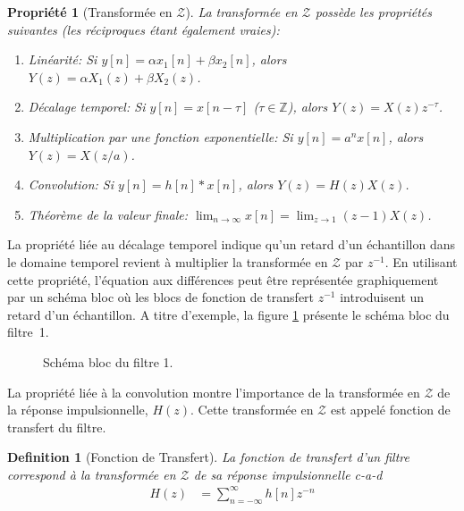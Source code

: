\documentclass[11pt,a4paper]{IEEEtran}
\newtheorem{propriete}{Propriété}
\newtheorem{definition}{Definition}
\begin{document}
\begin{propriete}[Transformée en $\mathcal{Z}$] La transformée en $\mathcal{Z}$ possède les propriétés suivantes (les réciproques étant également vraies):
\begin{enumerate}
\item Linéarité: Si $y[n]=\alpha x_1[n]+\beta x_2[n]$, alors $Y(z)=\alpha X_1(z)+\beta X_2(z)$.
\item Décalage temporel: Si $y[n]=x[n-\tau]$ ($\tau \in \mathbb{Z}$), alors $Y(z)=X(z)z^{-\tau}$.
\item Multiplication par une fonction exponentielle: Si $y[n]= a^n x[n]$, alors $ Y(z)=X(z/a)$.
\item Convolution: Si $y[n]= h[n]*x[n]$, alors $ Y(z)=H(z)X(z)$.
\item Théorème de la valeur finale: $\lim_{n\to \infty} x[n]=\lim_{z\to 1}(z-1)X(z)$.
\end{enumerate}
\end{propriete}

La propriété liée au décalage temporel indique qu'un retard d'un échantillon dans le domaine temporel revient à multiplier la transformée en $\mathcal{Z}$ par $z^{-1}$. En utilisant cette propriété, l'équation aux différences peut être représentée graphiquement par un schéma bloc où les blocs de fonction de transfert $z^{-1}$ introduisent un retard d'un échantillon. A titre d'exemple, la figure \ref{fig_schema} présente le schéma bloc du filtre~1.

\begin{figure}[!h]

\caption{Schéma bloc du filtre 1.}\label{fig_schema}
\end{figure}

La propriété liée à la convolution montre l'importance de la transformée en $\mathcal{Z}$ de la réponse impulsionnelle, $H(z)$. Cette transformée en $\mathcal{Z}$ est appelé fonction de transfert du filtre. 
\begin{definition}[Fonction de Transfert]
La fonction de transfert d'un filtre correspond à la transformée en $\mathcal{Z}$ de sa réponse impulsionnelle c-a-d
\begin{align}
H(z)&=\sum_{n=-\infty}^{\infty}h[n]z^{-n}
\end{align}
\end{definition}
\end{document}
